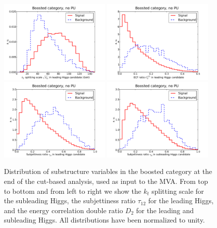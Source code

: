 \begin{figure}[t]
  \begin{center}
    \includegraphics[width=0.48\textwidth]{plots/split12_h1_C1_boost.pdf} 
  \includegraphics[width=0.48\textwidth]{plots/EEC_C2_h0_C1_boost.pdf}
  \includegraphics[width=0.48\textwidth]{plots/tau21_h0_C1_boost.pdf}
  \includegraphics[width=0.48\textwidth]{plots/tau21_h1_C1_boost.pdf}
  \caption{\small Distribution of substructure variables
    in the boosted category at the end of the cut-based
    analysis, used as input to the MVA.
    From top to bottom and from left to right we show  the
$k_t$ splitting scale for
the subleading Higgs, the subjettiness ratio $\tau_{12}$
for the leading Higgs,
and the energy correlation double ratio $D_2$
for the leading and subleading Higgs.
%
All distributions have been normalized to unity.
}
\label{fig:mva_substructure_1}
\end{center}
\end{figure}


